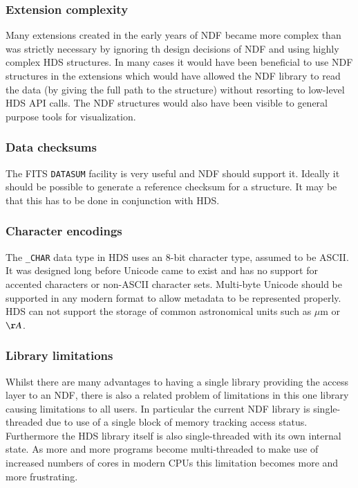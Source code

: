 \documentclass[final,authoryear,5p,times,twocolumn]{elsarticle}
\begin{document}
{\subsubsection{Extension complexity}

Many extensions created in the early years of NDF became more complex
than was strictly necessary by ignoring th design decisions of NDF and
using highly complex HDS structures. In many cases it would have been
beneficial to use NDF structures in the extensions which would have
allowed the NDF library to read the data (by giving the full path to
the structure) without resorting to low-level HDS API calls. The NDF
structures would also have been visible to general purpose tools for
visualization.

\subsubsection{Data checksums}

The FITS \texttt{DATASUM} facility is very useful and NDF should support
it. Ideally it should be possible to generate a reference checksum for
a structure. It may be that this has to be done in conjunction with
HDS.

\subsubsection{Character encodings}

The \texttt{\_CHAR} data type in HDS uses an 8-bit character type,
assumed to be ASCII. It was designed long before Unicode came to exist
and has no support for accented characters or non-ASCII character
sets. Multi-byte Unicode should be supported in any modern format to
allow metadata to be represented properly. HDS can not support the
storage of common astronomical units such as $\mu$m or $\AA$.

\subsubsection{Library limitations}

Whilst there are many advantages to having a single library
providing the access layer to an NDF, there is also a related problem
of limitations in this one library causing limitations to all
users. In particular the current NDF library is single-threaded due to
use of a single block of memory tracking access status. Furthermore
the HDS library itself is also single-threaded with its own internal
state. As more and more programs become multi-threaded to make use of
increased numbers of cores in modern CPUs this limitation becomes more
and more frustrating.

}
\end{document}
